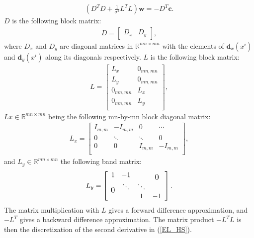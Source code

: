 \documentclass[10pt,a4paper]{article}
\newcommand\bigzero{\makebox(0,0){\text{\large 0}}}
\begin{document}
\begin{align}
(D^T D + \frac{1}{\sigma^2} L^TL) \textbf{w} = - D^T \textbf{c}.
\end{align}
$D$ is the following block matrix:
\begin{align*}
D = \left[
\begin{array}{c|c}
D_x & D_y
\end{array}
\right],
\end{align*}
where $D_x$ and $D_y$ are diagonal matrices in $\mathbb{R}^{mn \times mn}$ with the elements of $\textbf{d}_x(x^i)$ and $\textbf{d}_y(x^i)$ along its diagonals respectively. $L$ is the following block matrix:
\begin{align*}
L = \left[
\begin{array}{c|c}
L_x & 0_{mn,mn} \\
L_y & 0_{mn,mn} \\
0_{mn,mn} & L_x \\
0_{mn,mn} & L_y \\
\end{array}
\right],
\end{align*}
$Lx \in \mathbb{R}^{mn \times mn}$ being the following mn-by-mn block diagonal matrix:
\begin{align*}
L_x = \left[
\begin{array}{c|c|c|c}
I_{m,m} & -I_{m,m} & 0 & \cdots \\ \hline
0 & \ddots & \ddots & 0 \\ \hline
0 & 0 & I_{m,m} & -I_{m,m} \\
\end{array}
\right],
\end{align*}
and $L_y \in \mathbb{R}^{mn \times mn}$ the following band matrix:
\begin{align*}
L_y = \left[
\begin{array}{c c c c}
1 & -1 &  & \bigzero \\ 
 \bigzero & \ddots & \ddots &  \\
 &  & 1 & -1 \\
\end{array}
\right].
\end{align*}
The matrix multiplication with $L$ gives a forward difference approximation, and $-L^T$ gives a backward difference approximation. The matrix product $-L^TL$ is then the discretization of the second derivative in (\ref{EL_HS}).
\end{document}
